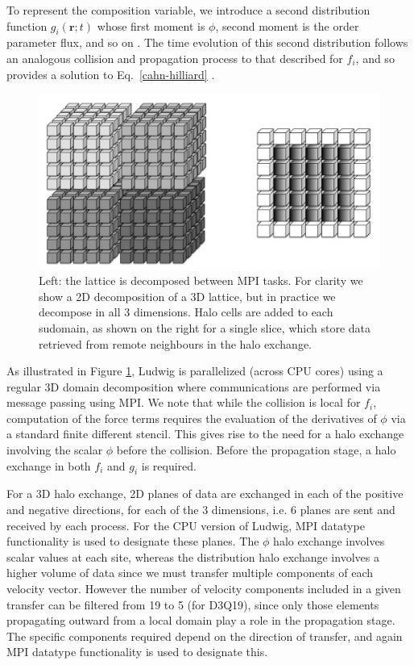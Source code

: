 To represent the composition variable, we introduce a second distribution
function $g_i (\mathbf{r};t)$ whose first moment is $\phi$, second moment
is the order parameter flux, and so on \cite{swift1996}.
The time evolution of this second distribution follows an analogous
collision and propagation process to that described for $f_i$, and
so provides a solution to Eq.~\ref{cahn-hilliard} \cite{stratford-jsp2005}.

\begin{figure}[!t]
\centering
\includegraphics[width=12cm]{Chapters/chapter14/figures/decomphalo}
\caption{Left: the lattice is decomposed between MPI tasks. For clarity we show a 2D decomposition of a 3D lattice, but in practice we decompose in all 3 dimensions. Halo cells are added to each sudomain, as shown on the right for a single slice, which store data retrieved from remote neighbours in the halo exchange.}
\label{ch14:fig:decomphalo}
\end{figure}


As illustrated in Figure \ref{ch14:fig:decomphalo}, Ludwig is
parallelized (across CPU cores) using a regular 3D domain decomposition
where communications are performed via message passing using MPI.  We
note that while the collision is local for $f_i$, computation of the
force terms requires the evaluation of the derivatives of $\phi$ via a
standard finite different stencil.  This gives rise to the need for a
halo exchange involving the scalar $\phi$ before the collision.
Before the propagation stage, a halo exchange in both $f_i$ and $g_i$
is required.

For a 3D halo exchange, 2D planes of data are exchanged in each of the
positive and negative directions, for each of the 3 dimensions, i.e. 6
planes are sent and received by each process.  For the CPU version of
Ludwig, MPI datatype functionality is used to designate these planes.
The $\phi$ halo exchange involves scalar values at each site, whereas
the distribution halo exchange involves a higher volume of data since
we must transfer multiple components of each velocity vector. However
the number of velocity components included in a given transfer can be
filtered from 19 to 5 (for D3Q19), since only those elements
propagating outward from a local domain play a role in the propagation
stage. The specific components required depend on the direction of
transfer, and again MPI datatype functionality is used to designate
this.



